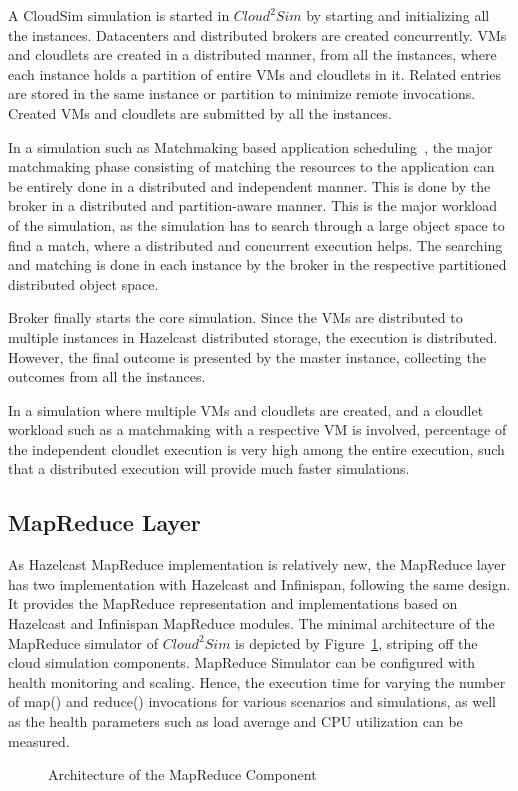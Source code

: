 A CloudSim simulation is started in $Cloud^{2}Sim$ by starting and initializing all the instances. Datacenters and distributed brokers are created concurrently. VMs and cloudlets are created in a distributed manner, from all the instances, where each instance holds a partition of entire VMs and cloudlets in it. Related entries are stored in the same instance or partition to minimize remote invocations. Created VMs and cloudlets are submitted by all the instances.

In a simulation such as Matchmaking based application scheduling~\cite{mm,mm2}, the major matchmaking phase consisting of matching the resources to the application can be entirely done in a distributed and independent manner. This is done by the broker in a distributed and partition-aware manner. This is the major workload of the simulation, as the simulation has to search through a large object space to find a match, where a distributed and concurrent execution helps. The searching and matching is done in each instance by the broker in the respective partitioned distributed object space.

Broker finally starts the core simulation. Since the VMs are distributed to multiple instances in Hazelcast distributed storage, the execution is distributed. However, the final outcome is presented by the master instance, collecting the outcomes from all the instances.

In a simulation where multiple VMs and cloudlets are created, and a cloudlet workload such as a matchmaking with a respective VM is involved, percentage of the independent cloudlet execution is very high among the entire execution, such that a distributed execution will provide much faster simulations.


\subsection{MapReduce Layer}
As Hazelcast MapReduce implementation is relatively new, the MapReduce layer has two implementation with Hazelcast and Infinispan, following the same design. It provides the MapReduce representation and implementations based on Hazelcast and Infinispan MapReduce modules. The minimal architecture of the MapReduce simulator of $Cloud^{2}Sim$ is depicted by Figure~\ref{fig:mapreduceImpl}, striping off the cloud simulation components. MapReduce Simulator can be configured with health monitoring and scaling. Hence, the execution time for varying the number of map() and reduce() invocations for various scenarios and simulations, as well as the health parameters such as load average and CPU utilization can be measured.
\begin{figure}[!htbp]
\begin{center}
\end{center}
 \caption{Architecture of the MapReduce Component}
 \label{fig:mapreduceImpl}
\end{figure}


